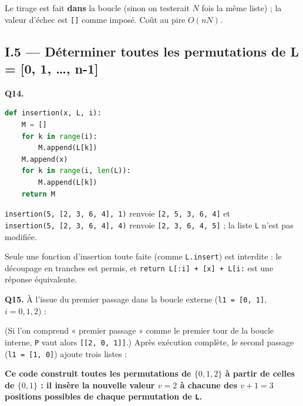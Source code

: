 \documentclass[11pt,a4paper]{article}
\newcommand{\equationajustee}[1]{%
  \sbox{\boiteequation}{$\displaystyle #1$}%
  \ifdim\wd\boiteequation>\linewidth
    \[\resizebox{\linewidth}{!}{\usebox{\boiteequation}}\]%
  \else
    \[#1\]%
  \fi}
\begin{document}
Le tirage est fait \textbf{dans} la boucle (sinon on testerait \(N\) fois la même liste) ; la valeur d'échec est \texttt{{[}{]}} comme imposé. Coût au pire \(O(nN)\).

\hypertarget{i.5-duxe9terminer-toutes-les-permutations-de-l-0-1-n-1}{%
\subsection{I.5 --- Déterminer toutes les permutations de L = {[}0, 1, \ldots, n-1{]}}\label{i.5-duxe9terminer-toutes-les-permutations-de-l-0-1-n-1}}

\textbf{Q14.}

\begin{lstlisting}[language=Python]
def insertion(x, L, i):
    M = []
    for k in range(i):
        M.append(L[k])
    M.append(x)
    for k in range(i, len(L)):
        M.append(L[k])
    return M
\end{lstlisting}

\texttt{insertion(\allowbreak{}5,\allowbreak{}\ {[}2,\allowbreak{}\ 3,\allowbreak{}\ 6,\allowbreak{}\ 4{]}\allowbreak{},\allowbreak{}\ 1)\allowbreak{}} renvoie \texttt{{[}2,\ 5,\ 3,\ 6,\ 4{]}} et \texttt{insertion(\allowbreak{}5,\allowbreak{}\ {[}2,\allowbreak{}\ 3,\allowbreak{}\ 6,\allowbreak{}\ 4{]}\allowbreak{},\allowbreak{}\ 4)\allowbreak{}} renvoie \texttt{{[}2,\ 3,\ 6,\ 4,\ 5{]}} ; la liste \texttt{L} n'est pas modifiée.

Seule une fonction d'insertion toute faite (comme \texttt{L.insert}) est interdite : le découpage en tranches est permis, et \texttt{return\ L{[}:\allowbreak{}i{]}\allowbreak{}\ +\ {[}x{]}\allowbreak{}\ +\ L{[}i:\allowbreak{}{]}\allowbreak{}} est une réponse équivalente.

\textbf{Q15.} À l'issue du premier passage dans la boucle externe (\texttt{l1\ =\ {[}0,\ 1{]}}, \(i = 0, 1, 2\)) :

\equationajustee{\boxed{P = [[2, 0, 1],\ [0, 2, 1],\ [0, 1, 2]]}}

(Si l'on comprend « premier passage » comme le premier tour de la boucle interne, \texttt{P} vaut alors \texttt{{[}{[}2,\ 0,\ 1{]}{]}}.) Après exécution complète, le second passage (\texttt{l1\ =\ {[}1,\ 0{]}}) ajoute trois listes :

\equationajustee{\boxed{P = [[2, 0, 1],\ [0, 2, 1],\ [0, 1, 2],\ [2, 1, 0],\ [1, 2, 0],\ [1, 0, 2]]}}

\textbf{Ce code construit toutes les permutations de \(\{0, 1, 2\}\) à partir de celles de \(\{0, 1\}\) : il insère la nouvelle valeur \(v = 2\) à chacune des \(v + 1 = 3\) positions possibles de chaque permutation de \texttt{L}.}
\end{document}
